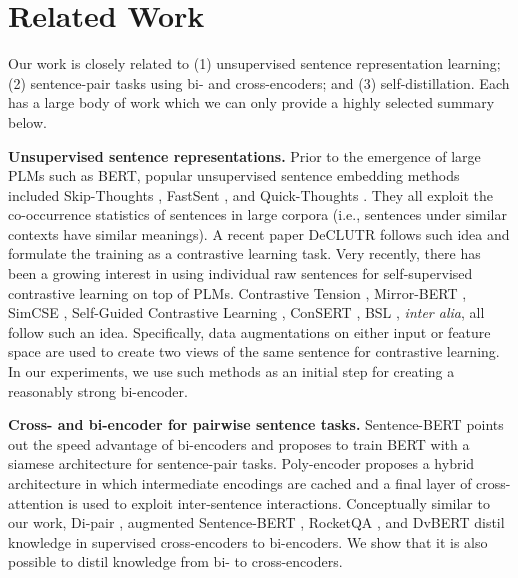 \documentclass{article} \usepackage{iclr2021_conference,times}
\begin{document}
\section{Related Work}\label{sec:related_work}

Our work is closely related to (1) unsupervised sentence representation learning; (2) sentence-pair tasks using bi- and cross-encoders; and (3) self-distillation. 
Each has a large body of work which we can only provide a highly selected summary below.

\textbf{Unsupervised sentence representations.} Prior to the emergence of large PLMs such as BERT, popular unsupervised sentence embedding methods included Skip-Thoughts \citep{kiros2015skip}, FastSent \citep{hill2016learning}, and Quick-Thoughts \citep{logeswaran2018an}. 
They all exploit the co-occurrence statistics of sentences in large corpora (i.e., sentences under similar contexts have similar meanings). 
A recent paper DeCLUTR \citep{giorgi-etal-2021-declutr} follows such idea and formulate the training as a contrastive learning task. 
Very recently, there has been a growing interest in using individual raw sentences for self-supervised contrastive learning on top of PLMs. 
Contrastive Tension \citep{carlsson2021semantic}, Mirror-BERT \citep{liu2021fast}, SimCSE \citep{gao2021simcse}, Self-Guided Contrastive Learning \citep{kim-etal-2021-self}, ConSERT \citep{yan-etal-2021-consert}, BSL \citep{zhang-etal-2021-bootstrapped}, \textit{inter alia}, all follow such an idea. Specifically, data augmentations on either input or feature space are used to create two views of the same sentence for contrastive learning. In our experiments, we use such methods as an initial step for creating a reasonably strong bi-encoder.

\textbf{Cross- and bi-encoder for pairwise sentence tasks.}
Sentence-BERT \citep{reimers2019sentence} points out the speed advantage of bi-encoders and proposes to train BERT with a siamese architecture for sentence-pair tasks. Poly-encoder \citep{Humeau2020Poly} proposes a hybrid architecture in which intermediate encodings are cached and a final layer of cross-attention is used to exploit inter-sentence interactions. Conceptually similar to our work, Di-pair \citep{chen-etal-2020-dipair}, augmented Sentence-BERT \citep{thakur-etal-2021-augmented}, RocketQA \citep{qu2021rocketqa}, and DvBERT \citep{cheng2021dual} distil knowledge in supervised cross-encoders to bi-encoders. 
We show that it is also possible to distil knowledge from bi- to cross-encoders.
\end{document}
